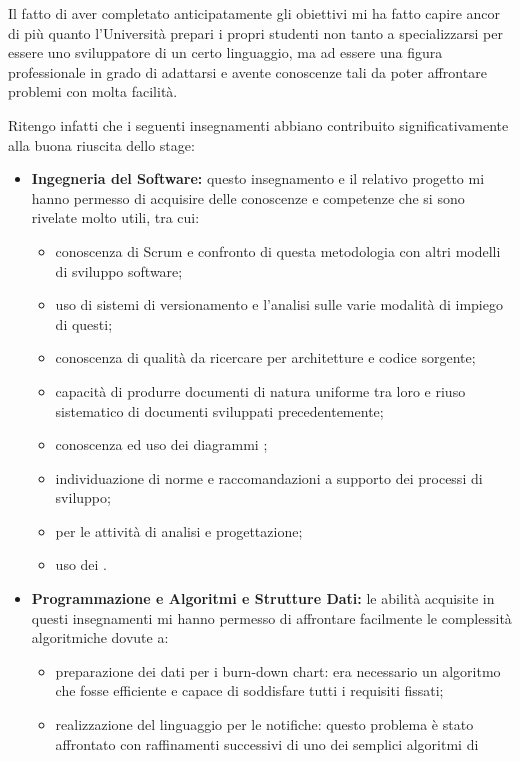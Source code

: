 Il fatto di aver completato anticipatamente gli obiettivi mi ha fatto capire
ancor di più quanto l'Università prepari i propri studenti non tanto a
specializzarsi per essere uno sviluppatore di un certo linguaggio, ma ad
essere una figura professionale in grado di adattarsi e avente conoscenze tali
da poter affrontare problemi con molta facilità.

Ritengo infatti che i seguenti insegnamenti abbiano contribuito
significativamente alla buona riuscita dello stage:

\begin{itemize}
\item \textbf{Ingegneria del Software:} questo insegnamento e il relativo
  progetto mi hanno permesso di acquisire delle conoscenze e competenze che si
  sono rivelate molto utili, tra cui:
  \begin{itemize}
  \item conoscenza di Scrum e confronto di questa metodologia con altri modelli
    di sviluppo software;
  \item uso di sistemi di versionamento e l'analisi sulle varie modalità di
    impiego di questi;
  \item conoscenza di qualità da ricercare per architetture e codice sorgente;
  \item capacità di produrre documenti di natura uniforme tra loro e riuso
    sistematico di documenti sviluppati precedentemente;
  \item conoscenza ed uso dei diagrammi ;
  \item individuazione di norme e raccomandazioni a supporto dei processi di
    sviluppo;
  \item {} per le attività di analisi e progettazione;
  \item uso dei .
  \end{itemize}
\item \textbf{Programmazione e Algoritmi e Strutture Dati:} le abilità
  acquisite in questi insegnamenti mi hanno permesso di affrontare facilmente
  le complessità algoritmiche dovute a:
  \begin{itemize}
  \item preparazione dei dati per i burn-down chart: era necessario un
    algoritmo che fosse efficiente e capace di soddisfare tutti i requisiti
    fissati;
  \item realizzazione del linguaggio per le notifiche: questo problema è stato
    affrontato con raffinamenti successivi di uno dei semplici algoritmi di

\end{itemize}
\end{itemize}
